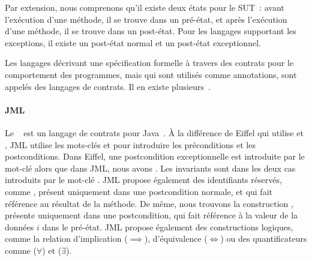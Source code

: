 Par extension, nous comprenons qu'il existe deux états pour le SUT~: avant
l'exécution d'une méthode, il se trouve dans un {\strong pré-état}, et après
l'exécution d'une méthode, il se trouve dans un {\strong post-état}. Pour les
langages supportant les exceptions, il existe un post-état normal et un
post-état exceptionnel.

Les langages décrivant une spécification formelle à travers des contrats pour
le comportement des programmes, mais qui sont utilisés comme annotations, sont
appelés des {\strong langages de contrats}. Il en existe
plusieurs~.

\paragraph{JML} Le ~ est un langage
de contrats pour Java~. À la différence de Eiffel qui utilise
 et , JML utilise les mots-clés  et
 pour introduire les préconditions et les postconditions. Dans
Eiffel, une postcondition exceptionnelle est introduite par le mot-clé
 alors que dans JML, nous avons . Les invariants sont
dans les deux cas introduits par le mot-clé . JML propose
également des identifiants réservés, comme \aresult, présent uniquement dans une
postcondition normale, et qui fait référence au résultat de la méthode.  De
même, nous trouvons la construction , présente uniquement dans une
postcondition, qui fait référence à la valeur de la données $i$ dans le
pré-état. JML propose également des constructions logiques, comme la relation
d'implication ($\implies$), d'équivalence ($\Longleftrightarrow$) ou des
quantificateurs comme  ($\forall$) et
 ($\exists$).

